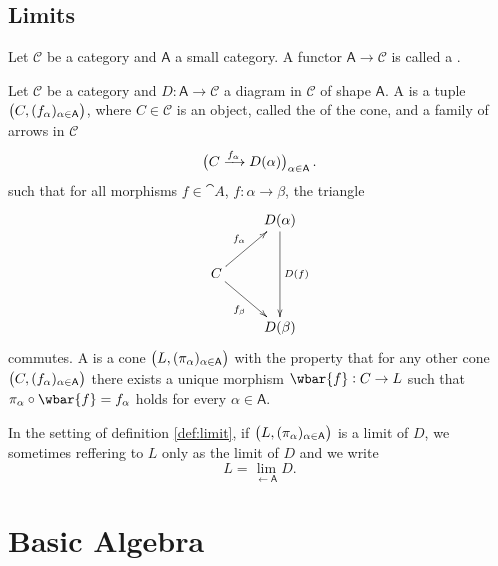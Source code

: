 \subsection*{Limits}

\begin{definition}[Diagram]
	Let $\mathcal{C}$ be a category and $\mathsf{A}$ a small category. A functor $\mathsf{A} \to \mathcal{C}$ is called a .
\end{definition}

\begin{definition}
	Let $\mathcal{C}$ be a category and $D : \mathsf{A} \to \mathcal{C}$ a diagram in $\mathcal{C}$ of shape $\mathsf{A}$. A  is a tuple $\del[1]{C,(f_\alpha)_{\alpha \in \mathsf{A}}}$, where $C \in \mathcal{C}$ is an object, called the  of the cone, and a family of arrows in $\mathcal{C}$
	\begin{equation}
		\del[1]{C \xrightarrow{f_\alpha} D(\alpha)}_{\alpha \in \mathsf{A}}.
	\end{equation}
	\noindent such that for all morphisms $f \in \cat{A}$, $f : \alpha \to \beta$, the triangle
	\begin{equation*}
		\xymatrix{
			& D(\alpha) \ar[dd]^{D(f)}\\
			C \ar[ur]^{f_\alpha}\ar[dr]_{f_\beta}\\
			& D(\beta)}
	\end{equation*}
	\noindent commutes. A  is a cone $\del[1]{L, (\pi_\alpha)_{\alpha \in \mathsf{A}}}$ with the property that for any other cone $\del[1]{C,(f_\alpha)_{\alpha \in \mathsf{A}}}$ there exists a unique morphism $\wbar{f} : C \to L$ such that $\pi_\alpha \circ \wbar{f} = f_\alpha$ holds for every $\alpha \in \mathsf{A}$.
	\label{def:limit}
\end{definition}

\begin{remark}
	In the setting of definition \ref{def:limit}, if $\del[1]{L, (\pi_\alpha)_{\alpha \in \cat{A}}}$ is a limit of $D$, we sometimes reffering to $L$ only as the limit of $D$ and we write
	\begin{equation}
		L = \lim_{\leftarrow \mathsf{A}} D.
	\end{equation}
\end{remark}

\section*{Basic Algebra}
